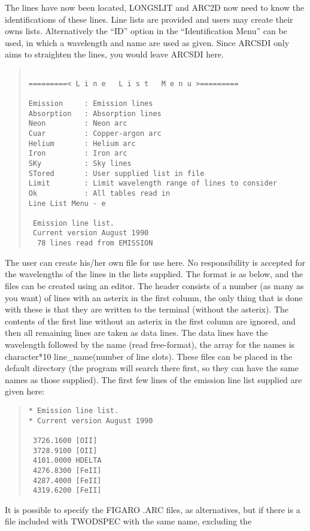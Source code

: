 The lines have now been located, LONGSLIT and ARC2D now need to know the
identifications of these lines.
Line lists are provided and users may create their owns lists.
Alternatively the ``ID'' option in the ``Identification Menu'' can be
used, in which a wavelength and name are used as given.
Since ARCSDI only aims to straighten the lines, you would leave ARCSDI
here.
\begin{quote}\begin{verbatim}
 
=========< L i n e   L i s t   M e n u >=========
 
Emission     : Emission lines
Absorption   : Absorption lines
Neon         : Neon arc
Cuar         : Copper-argon arc
Helium       : Helium arc
Iron         : Iron arc
SKy          : Sky lines
STored       : User supplied list in file
Limit        : Limit wavelength range of lines to consider
Ok           : All tables read in
Line List Menu - e
 
 Emission line list.
 Current version August 1990
  78 lines read from EMISSION
\end{verbatim}\end{quote}
The user can create his/her own file for use here.
No responsibility is accepted for the wavelengths of the lines in the
lists supplied.
The format is as below, and the files can be created using an editor.
The header consists of a number (as many as you want) of lines with an
asterix in the first column, the only thing that is done with
these is that they are written to the terminal (without the asterix).
The contents of the first line without an asterix in the first column
are ignored, and then all remaining lines are taken as data lines.
The data lines have the wavelength followed by the name (read
free-format), the array for the names is character*10 line\_name(number
of line slots).
These files can be placed in the default directory (the program will
search there first, so they can have the same names as those supplied).
The first few lines of the emission line list supplied are given here:
\begin{quote}\begin{verbatim}
* Emission line list.
* Current version August 1990

 3726.1600 [OII]
 3728.9100 [OII]
 4101.0000 HDELTA
 4276.8300 [FeII]
 4287.4000 [FeII]
 4319.6200 [FeII]
\end{verbatim}\end{quote}
It is possible to specify the FIGARO .ARC files, as alternatives, but if
there is a file included with TWODSPEC with the same name, excluding the
